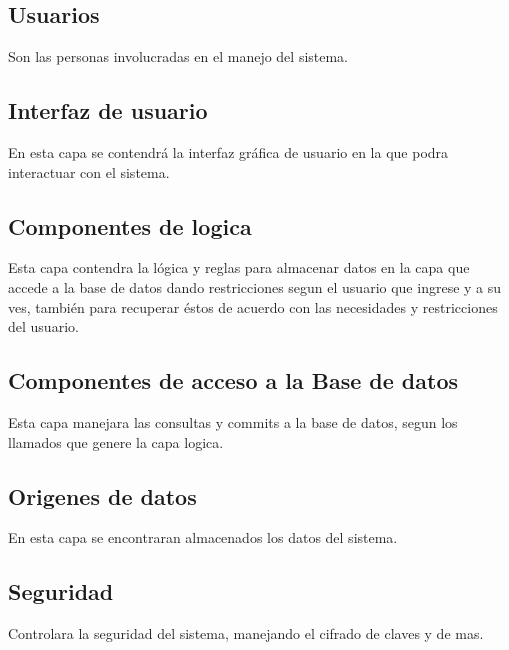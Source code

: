 \documentclass[12pt]{article}
\begin{document}
\subsection{Usuarios} 
Son las personas involucradas en el manejo del sistema.
\subsection{Interfaz de usuario}
En esta capa se contendr\'a la interfaz gráfica de usuario en la que podra interactuar con el sistema.
\subsection{Componentes de logica}
Esta capa contendra la lógica y reglas para almacenar datos en la capa que accede a la base de datos dando restricciones segun el usuario que ingrese y a su ves, tambi\'en para recuperar éstos de acuerdo con las necesidades y restricciones del usuario.
\subsection{Componentes de acceso a la Base de datos}
Esta capa manejara las consultas y commits a la base de datos, segun los llamados que genere la capa logica.
\subsection{Origenes de datos}
En esta capa se encontraran almacenados los datos del sistema.
\subsection{Seguridad}
Controlara la seguridad del sistema, manejando el cifrado de claves y de mas.
\end{document}
